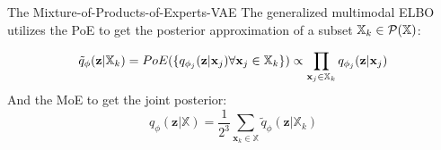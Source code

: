             \begin{frame}{The Mixture-of-Products-of-Experts-VAE}
                The generalized multimodal ELBO utilizes the PoE to get the posterior approximation of a subset $\mathbb{X}_k \in \mathcal{P}(\mathbb{X})$:

\begin{equation}
    \tilde{q}_{\phi}(\textbf{z}|\mathbb{X}_k)=PoE(\{q_{\phi_j}(\textbf{z}|\textbf{x}_j) \forall \textbf{x}_j \in \mathbb{X}_k\}) \propto \prod _{\textbf{x}_j \in \mathbb{X}_k}q_{\phi_j}(\textbf{z}|\textbf{x}_j)
\end{equation}
And the MoE to get the joint posterior:
\begin{equation}
    q_{\phi}(\textbf{z}|\mathbb{X}) = \frac{1}{2^3} \sum _{\textbf{x}_k \in \mathbb{X}} \tilde{q}_{\phi} (\textbf{z}|\mathbb{X}_k)
\end{equation}
            \end{frame}
            
